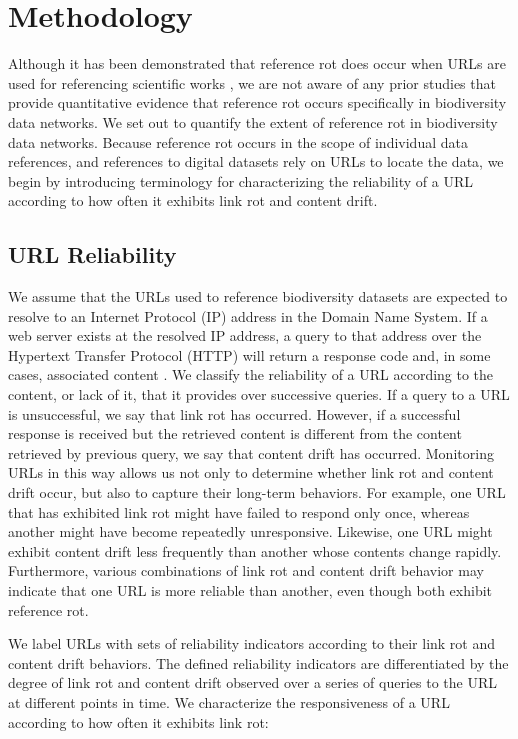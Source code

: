 \section*{Methodology}

Although it has been demonstrated that reference rot does occur when URLs are used for referencing scientific works \citep{Vision_2010,Klein_2014}, we are not aware of any prior studies that provide quantitative evidence that reference rot occurs specifically in biodiversity data networks. We set out to quantify the extent of reference rot in biodiversity data networks. Because reference rot occurs in the scope of individual data references, and references to digital datasets rely on URLs to locate the data, we begin by introducing terminology for characterizing the reliability of a URL according to how often it exhibits link rot and content drift.

\subsection*{URL Reliability}
We assume that the URLs used to reference biodiversity datasets are expected to resolve to an Internet Protocol (IP) address in the Domain Name System. If a web server exists at the resolved IP address, a query to that address over the Hypertext Transfer Protocol (HTTP) will return a response code and, in some cases, associated content \citep{rfc3986}.  We classify the reliability of a URL according to the content, or lack of it, that it provides over successive queries. If a query to a URL is unsuccessful, we say that link rot has occurred. However, if a successful response is received but the retrieved content is different from the content retrieved by previous query, we say that content drift has occurred. Monitoring URLs in this way allows us not only to determine whether link rot and content drift occur, but also to capture their long-term behaviors. For example, one URL that has exhibited link rot might have failed to respond only once, whereas another might have become repeatedly unresponsive. Likewise, one URL might exhibit content drift less frequently than another whose contents change rapidly. Furthermore, various combinations of link rot and content drift behavior may indicate that one URL is more reliable than another, even though both exhibit reference rot.

We label URLs with sets of reliability indicators according to their link rot and content drift behaviors. The defined reliability indicators are differentiated by the degree of link rot and content drift observed over a series of queries to the URL at different points in time. We characterize the responsiveness of a URL according to how often it exhibits link rot: 

